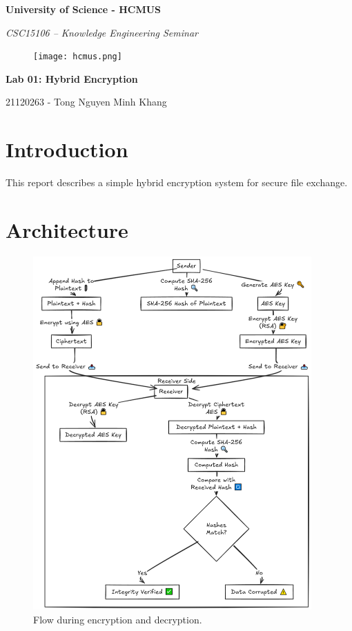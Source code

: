 \documentclass{article}
\begin{document}
\begin{titlepage}
\centering

{\Large \textbf{University of Science - HCMUS}}

\vspace{0.5cm}
{\itshape\large CSC15106 – Knowledge Engineering Seminar}


\vspace{2cm}
\begin{figure}[!h]
    \centering
    \texttt{[image: hcmus.png]}
\end{figure}

\vfill

{\LARGE\bfseries Lab 01: Hybrid Encryption}

\vspace{1cm}

{\large 21120263 - Tong Nguyen Minh Khang}

\end{titlepage}

\section{Introduction}
This report describes a simple hybrid encryption system for secure file exchange.

\section{Architecture}

\begin{figure}[!h]
    \centering
    \includegraphics[width=0.95\textwidth]{diagram.png}
    \caption{Flow during encryption and decryption.}
    \label{fig:sample}
\end{figure}
\end{document}

